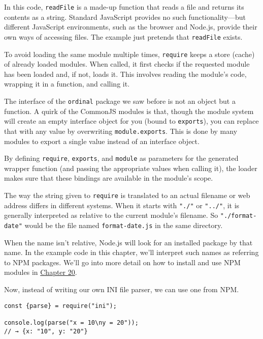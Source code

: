 In this code, \lstinline`readFile` is a made-up function that reads a file and returns its contents as a string. Standard JavaScript provides no such functionality—but different JavaScript environments, such as the browser and Node.js, provide their own ways of accessing files. The example just pretends that \lstinline`readFile` exists.

To avoid loading the same module multiple times, \lstinline`require` keeps a store (cache) of already loaded modules. When called, it first checks if the requested module has been loaded and, if not, loads it. This involves reading the module's code, wrapping it in a function, and calling it.

The interface of the \lstinline`ordinal` package we saw before is not an object but a function. A quirk of the CommonJS modules is that, though the module system will create an empty interface object for you (bound to \lstinline`exports`), you can replace that with any value by overwriting \lstinline`module.exports`. This is done by many modules to export a single value instead of an interface object.

By defining \lstinline`require`, \lstinline`exports`, and \lstinline`module` as parameters for the generated wrapper function (and passing the appropriate values when calling it), the loader makes sure that these bindings are available in the module's scope.

The way the string given to \lstinline`require` is translated to an actual filename or web address differs in different systems. When it starts with \lstinline`"./"` or \lstinline`"../"`, it is generally interpreted as relative to the current module's filename. So \lstinline`"./format-date"` would be the file named \lstinline`format-date.js` in the same directory.

When the name isn't relative, Node.js will look for an installed package by that name. In the example code in this chapter, we'll interpret such names as referring to NPM packages. We'll go into more detail on how to install and use NPM modules in \hyperref[node]{Chapter 20}.

\label{modules.modules_ini}Now, instead of writing our own INI file parser, we can use one from NPM.

\begin{lstlisting}
const {parse} = require("ini");

console.log(parse("x = 10\ny = 20"));
// → {x: "10", y: "20"}
\end{lstlisting}
\noindent

